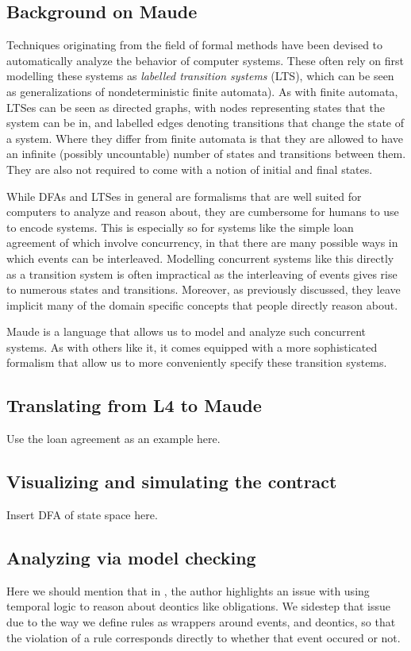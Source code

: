\documentclass{article}
\begin{document}
\subsection{Background on Maude}
Techniques originating from the field of formal methods have been devised to
automatically analyze the behavior of computer systems.
These often rely on first modelling these systems as
\textit{labelled transition systems} (LTS), which can be seen as
generalizations of nondeterministic finite automata).
As with finite automata, LTSes can be seen as directed graphs, with nodes
representing states that the system can be in, and labelled edges denoting
transitions that change the state of a system.
Where they differ from finite automata is that they are allowed to have an
infinite (possibly uncountable) number of states and transitions
between them.
They are also not required to come with a notion of initial and final states.

While DFAs and LTSes in general are formalisms that are well suited for
computers to analyze and reason about, they are cumbersome for humans to use
to encode systems.
This is especially so for systems like the simple loan agreement of
\cite{contract_as_automaton} which involve concurrency, in that there are
many possible ways in which events can be interleaved.
Modelling concurrent systems like this directly as a transition system is
often impractical as the interleaving of events gives rise to numerous states
and transitions.
Moreover, as previously discussed, they leave implicit many of the domain
specific concepts that people directly reason about.

Maude is a language that allows us to model and analyze such concurrent systems.
As with others like it, it comes equipped with a more sophisticated formalism
that allow us to more conveniently specify these transition systems.

\subsection{Translating from L4 to Maude}
Use the loan agreement as an example here.

\subsection{Visualizing and simulating the contract}
Insert DFA of state space here.

\subsection{Analyzing via model checking}
Here we should mention that in \cite{temporal_logic_norms_guido}, the author
highlights an issue with using temporal logic to reason about deontics like
obligations.
We sidestep that issue due to the way we define rules as wrappers around
events, and deontics, so that the violation of a rule corresponds directly to
whether that event occured or not.
\end{document}
